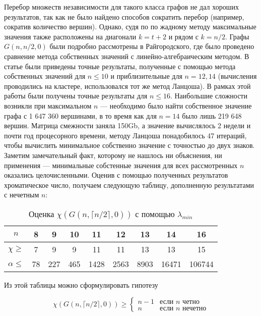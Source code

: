 Перебор множеств независимости для такого класса графов не дал хороших
результатов, так как не было найдено способов сократить перебор (например,
сократив количество вершин). Однако, судя по по жадному методу максимальные
значения также расположены на диагонали $k=t+2$ и рядом с $k=n/2$.
Графы $G(n,n/2,0)$ были подробно рассмотрены в Райгородского,
где было
проведено сравнение метода собственных значений с линейно-алгебраическим
методом. В статье были приведены точные результаты, полученные с помощью
метода собственных значений для $n \leq 10$ и приблизительные для $n = 12,14$
(вычисления проводились на кластере, использовался тот же метод Ланцоша).
В рамках этой работы были получены точные результаты для $n \leq 16$.
Наибольшие сложности возникли при максимальном $n$ --- необходимо было найти
собственное значение графа с 1 647 360 вершинами,
в то время как для $n=14$ было лишь 219 648 вершин.
Матрица смежности заняла 150Gb, а значение вычислялось
2 недели и почти год процесорного времени, методу Ланцоша понадобилось 47
итераций, чтобы вычислить минимальное собственно значение с точностью до двух
знаков. Заметим замечательный факт, которому не нашлось ни объяснения, ни
применения --- минимальные собстенные значения для всех рассмотренных $n$
оказались целочисленными. Оценив с помощью полученных результатов хроматическое
число, получаем следующую таблицу, дополненную результатами с нечетным $n$:
\begin{table}[h]
    \centering
    \caption{Оценка $\chi(G(n,\lceil n/2\rceil,0))$ с помощью $\lambda_{min}$}
\begin{tabular}{|c|c|c|c|c|c|c|c|c|}
\hline
$n$ &           8  & 9   & 10 & 11   & 12  & 13 & 14 & 16 \\ \hline
$\chi \geq$   & 7  & 9   &  9 & 11   & 11  & 13 & 13 & 15 \\ \hline
$\alpha \leq$ & 78 & 227 &465 & 1428 &2563 & 8903 & 16471 & 106744 \\ \hline
\end{tabular}
\end{table}

Из этой таблицы можно сформулировать гипотезу
\begin{hyposesis}
    \begin{displaymath}
        \chi(G(n,\lceil n/2\rceil,0)) \geq \left\{ \begin{array}{ll}
            n-1 & \textrm{если $n$ четно}\\
            n & \textrm{если $n$ нечетно}
        \end{array} \right.
    \end{displaymath}
\end{hyposesis}

